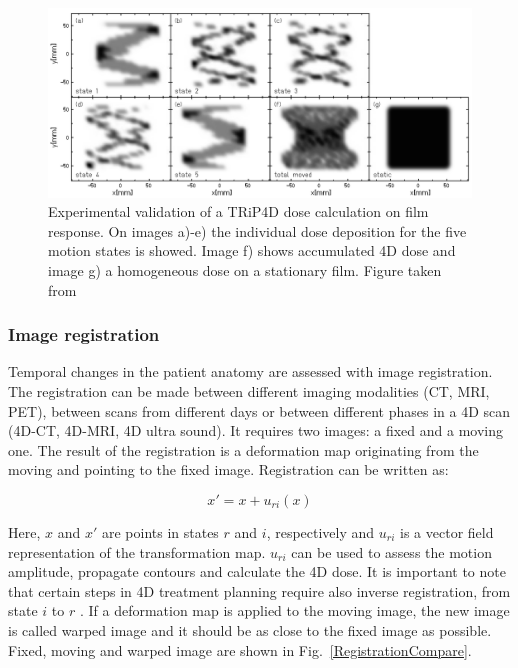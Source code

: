 \begin{figure}[H]
\begin{center}
\includegraphics[scale=0.35]{./Fundamentals/Images/4DtreatmentPlanning.png}
\caption{Experimental validation of a TRiP4D dose calculation on film response. On images a)-e) the individual dose deposition for the five motion states is showed.
Image f) shows accumulated 4D dose and image g) a homogeneous dose on a stationary film. Figure taken from \cite{Richter2012}}
\label{TRiP4Ddose}
\end{center}
\end{figure}

\subsubsection{Image registration}
\label{sec:registration}


Temporal changes in the patient anatomy are assessed with image registration. The registration can be made between different imaging modalities (CT, MRI, PET), between scans from different days or between
different phases in a 4D scan (4D-CT, 4D-MRI, 4D ultra sound). It requires two images: a fixed and a moving one. The result of the registration is a deformation map originating from the moving and pointing to the fixed image. Registration can be written as:


\begin{equation}
\label{df}
x' = x + u_{ri}(x)
\end{equation} 

Here, $x$ and $x'$ are points in states $r$ and $i$, respectively and $u_{ri}$ is a vector field representation of the transformation map. $u_{ri}$ can be used to assess the motion amplitude, propagate contours and calculate the 4D dose.
It is important to note that certain steps in 4D treatment planning require also inverse registration, from state $i$ to $r$ \cite{Richter2012}. If a deformation map is applied to the moving image, 
the new image is called warped image and it should be as close to the fixed image as possible. Fixed, moving and warped image are shown in Fig.~\ref{RegistrationCompare}. 

